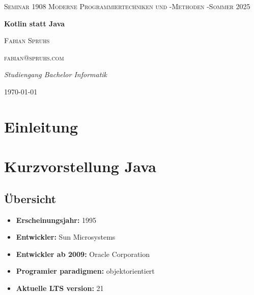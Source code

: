 \documentclass[11pt]{article}
\begin{document}
    \begin{titlepage}
        \centering
        {\scshape\LARGE Seminar 1908 Moderne Programmiertechniken und -Methoden -Sommer 2025 \par}
        \vspace{1cm}
        {\huge\bfseries Kotlin statt Java\par}
        \vspace{1.5cm}
        {\scshape\Large Fabian Spruhs\par}
        {\scshape fabian@spruhs.com\par}
        \vspace{2cm}
        {\Large\itshape Studiengang Bachelor Informatik\par}
        \vspace{2cm}


        {\large \today\par}
    \end{titlepage}

    \tableofcontents
    \newpage

    \section{Einleitung}
    \section{Kurzvorstellung Java}
    \subsection{Übersicht}
    \begin{itemize}
        \item \textbf{Erscheinungsjahr:} 1995
        \item \textbf{Entwickler:} Sun Microsystems
        \item \textbf{Entwickler ab 2009:} Oracle Corporation
        \item \textbf{Programier paradigmen:} objektorientiert
        \item \textbf{Aktuelle LTS version:} 21
    \end{itemize}
\end{document}
